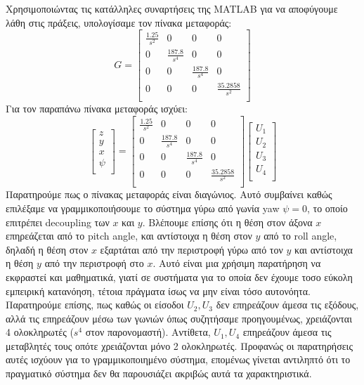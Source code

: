 \documentclass[a4paper,12pt]{article}
\begin{document}
\noindent
Χρησιμοποιώντας τις κατάλληλες συναρτήσεις της MATLAB για να αποφύγουμε λάθη στις πράξεις, υπολογίσαμε τον πίνακα μεταφοράς:
\begin{equation*}
G = 
\begin{bmatrix}
\frac{1.25}{s^2} & 0 & 0 & 0\\
0 & \frac{187.8}{s^4} & 0 & 0\\
0 & 0 & \frac{187.8}{s^4} & 0\\
0 & 0 & 0 & \frac{35.2858}{s^2}\\
\end{bmatrix}
\end{equation*}
\noindent
Για τον παραπάνω πίνακα μεταφοράς ισχύει:
\begin{equation*}
\begin{bmatrix}
    z\\
    y\\
    x\\
    \psi\\
\end{bmatrix} = 
\begin{bmatrix}
\frac{1.25}{s^2} & 0 & 0 & 0\\
0 & \frac{187.8}{s^4} & 0 & 0\\
0 & 0 & \frac{187.8}{s^4} & 0\\
0 & 0 & 0 & \frac{35.2858}{s^2}\\
\end{bmatrix}
\begin{bmatrix}
    U_1\\
    U_2\\
    U_3\\
    U_4\\
\end{bmatrix}
\end{equation*}
Παρατηρούμε πως ο πίνακας μεταφοράς είναι διαγώνιος. Αυτό συμβαίνει καθώς επιλέξαμε να γραμμικοποιήσουμε το σύστημα γύρω από γωνία yaw $\psi = 0$, το οποίο επιτρέπει decoupling των $x$ και $y$. Βλέπουμε επίσης ότι η θέση στον άξονα $x$ επηρεάζεται από το pitch angle, και αντίστοιχα η θέση στον $y$ από το roll angle, δηλαδή η θέση στον $x$ εξαρτάται από την περιστροφή γύρω από τον $y$ και αντίστοιχα η θέση $y$ από την περιστροφή στο $x$. Αυτό είναι μια χρήσιμη παρατήρηση να εκφραστεί και μαθηματικά, γιατί σε συστήματα για το οποία δεν έχουμε τοσο εύκολη εμπειρική κατανόηση, τέτοια πράγματα ίσως να μην είναι τόσο αυτονόητα. Παρατηρούμε επίσης, πως καθώς οι είσοδοι $U_2, U_3$ δεν επηρεάζουν άμεσα τις εξόδους, αλλά τις επηρεάζουν μέσω των γωνιών όπως συζητήσαμε προηγουμένως, χρειάζονται 4 ολοκληρωτές ($s^4$ στον παρονομαστή). Αντίθετα, $U_1, U_4$ επηρεάζουν άμεσα τις μεταβλητές τους οπότε χρειάζονται μόνο 2 ολοκληρωτές.
\newline
\newline
Προφανώς οι παρατηρήσεις αυτές ισχύουν για το γραμμικοποιημένο σύστημα, επομένως γίνεται αντιληπτό ότι το πραγματικό σύστημα δεν θα παρουσιάζει ακριβώς αυτά τα χαρακτηριστικά.
\newpage
\end{document}
